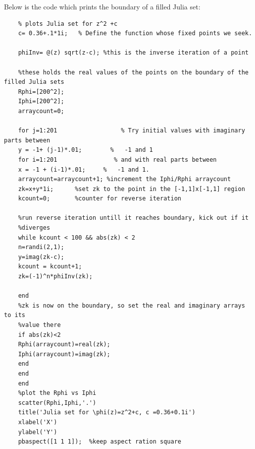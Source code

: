 \documentclass[12pt]{article}
\begin{document}
	\noindent Below is the code which prints the boundary of a filled Julia set: \\

	\begin{verbatim}
	% plots Julia set for z^2 +c
	c= 0.36+.1*1i;   % Define the function whose fixed points we seek.
	
	phiInv= @(z) sqrt(z-c); %this is the inverse iteration of a point
	
	%these holds the real values of the points on the boundary of the filled Julia sets
	Rphi=[200^2];
	Iphi=[200^2];
	arraycount=0;
	
	for j=1:201                  % Try initial values with imaginary parts between
	y = -1+ (j-1)*.01;        %   -1 and 1
	for i=1:201                % and with real parts between
	x = -1 + (i-1)*.01;     %   -1 and 1.
	arraycount=arraycount+1; %increment the Iphi/Rphi arraycount
	zk=x+y*1i;      %set zk to the point in the [-1,1]x[-1,1] region
	kcount=0;       %counter for reverse iteration
	
	%run reverse iteration untill it reaches boundary, kick out if it
	%diverges
	while kcount < 100 && abs(zk) < 2
	n=randi(2,1);
	y=imag(zk-c);
	kcount = kcount+1;
	zk=(-1)^n*phiInv(zk);
	
	end
	%zk is now on the boundary, so set the real and imaginary arrays to its
	%value there
	if abs(zk)<2
	Rphi(arraycount)=real(zk);
	Iphi(arraycount)=imag(zk);
	end
	end
	end
	%plot the Rphi vs Iphi
	scatter(Rphi,Iphi,'.')
	title('Julia set for \phi(z)=z^2+c, c =0.36+0.1i')
	xlabel('X')
	ylabel('Y')
	pbaspect([1 1 1]);  %keep aspect ration square
		
	\end{verbatim}
	
	
\end{document}
